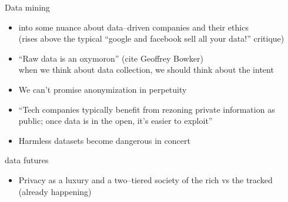\documentclass[presentation]{subfiles}
\begin{document}
\begin{frame}{Data mining}
\begin{itemize}
  \item into some nuance about data--driven companies and their ethics\\
    {\footnotesize (rises above the typical ``google and facebook sell all your data!'' critique)}
    \item ``Raw data is an oxymoron'' (cite Geoffrey Bowker)\\
    {\footnotesize when we think about data collection, we should think about the intent}
    \item We can't promise anonymization in perpetuity
    \item ``Tech companies typically benefit from rezoning private information as public; once data is in the open, it's easier to exploit''
    \item Harmless datasets become dangerous in concert

\end{itemize}


\end{frame}

\begin{frame}{data futures}
\begin{itemize}
  \item Privacy as a luxury and a two--tiered society of the rich vs the tracked (already happening)
\end{itemize}
\end{frame}
\end{document}

